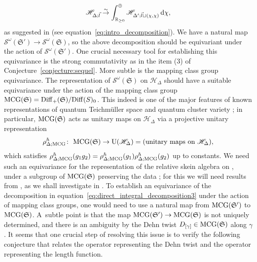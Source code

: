 \documentclass[10pt,a4paper]{amsart}
\numberwithin{equation}{section}
\theoremstyle{definition}
\begin{document}
\begin{align}
\label{eq:direct_integral_decomposition3}
\mathscr{H}_{\Delta;\vec{l}} \stackrel{\sim}{\to} \int_{ \mathbb{R}_{\ge 0} }^\oplus \mathscr{H}_{\Delta'; \vec{l}\sqcup(\chi,\chi)} \, {\rm d}\chi,
\end{align}
as suggested in \cite{FG09} (see equation~\eqref{eq:intro_decomposition}). We have a natural map $\mathcal{S}^\omega(\mathfrak{S}') \to \mathcal{S}^\omega(\mathfrak{S})$, so the above decomposition should be equivariant under the action of $\mathcal{S}^\omega(\mathfrak{S}')$. One crucial necessary tool for establishing this equivariance is the strong commutativity as in the item (3) of Conjecture~\ref{conjecture:sequel}. More subtle is the mapping class group equivariance. The representation of $\mathcal{S}^\omega(\mathfrak{S})$ on $\mathscr{H}_\Delta$ should have a suitable equivariance under the action of the mapping class group ${\rm MCG}(\mathfrak{S}) = {\rm Diff}_+(\mathfrak{S})/{\rm Diff}(S)_0$. This indeed is one of the major features of known representations of quantum Teichm\"uller space \cite{F97,CF,Kash98} and quantum cluster variety \cite{FG09}; in particular, ${\rm MCG}(\mathfrak{S})$ acts as unitary maps on $\mathscr{H}_\Delta$ via a projective unitary representation
\[
\rho^\hbar_{\Delta;{\rm MCG}} \colon \ {\rm MCG}(\mathfrak{S}) \to {\rm U}(\mathscr{H}_\Delta) = \mbox{(unitary maps on $\mathscr{H}_\Delta$)},
\]
which satisfies $\rho^\hbar_{\Delta;{\rm MCG}}(g_1g_2) = \rho^\hbar_{\Delta;{\rm MCG}}(g_1)\rho^\hbar_{\Delta;{\rm MCG}}(g_2)$ up to constants. We need such an equivariance for the representation of the relative skein algebra  on , under a subgroup of ${\rm MCG}(\mathfrak{S})$ preserving the data ; for this we will need results from \cite{Kim_irreducible}, as we shall investigate in \cite{sequel}. To establish an equivariance of the decomposition in equation~\eqref{eq:direct_integral_decomposition3} under the action of mapping class groups, one would need to use a natural map from ${\rm MCG}(\mathfrak{S}')$ to ${\rm MCG}(\mathfrak{S})$. A~subtle point is that the map ${\rm MCG}(\mathfrak{S}') \to {\rm MCG}(\mathfrak{S})$ is not uniquely determined, and there is an ambiguity by the Dehn twist $D_{[\gamma]} \in {\rm MCG}(\mathfrak{S})$ along $\gamma$. It seems that one crucial step of resolving this issue is to verify the following conjecture that relates the operator representing the Dehn twist and the operator representing the length function.
\end{document}
